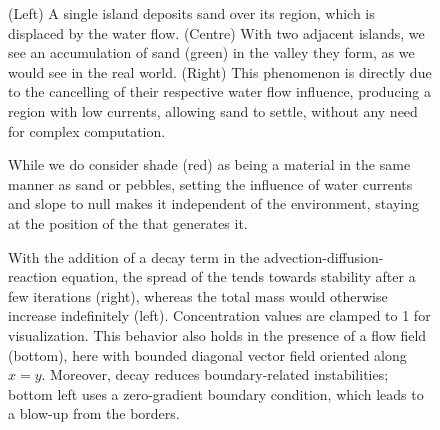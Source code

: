 \begin{figure}
    \caption{(Left) A single island deposits sand over its region, which is displaced by the water flow. (Centre) With two adjacent islands, we see an accumulation of sand (green) in the valley they form, as we would see in the real world. (Right) This phenomenon is directly due to the cancelling of their respective water flow influence, producing a region with low currents, allowing sand to settle, without any need for complex computation.}
    \label{fig:env-obj-double-island-sand-deposition}
\end{figure}

\begin{figure}
    \caption{While we do consider shade (red) as being a material in the same manner as sand or pebbles, setting the influence of water currents and slope to null makes it independent of the environment, staying at the position of the  that generates it.}
    \label{fig:env-obj-shade}
\end{figure}

\begin{figure}[H]
    \autofitcaptions[]{}
    \caption{With the addition of a decay term in the advection-diffusion-reaction equation, the spread of the  tends towards stability after a few iterations (right), whereas the total mass would otherwise increase indefinitely (left). Concentration values are clamped to 1 for visualization. This behavior also holds in the presence of a flow field (bottom), here with bounded diagonal vector field oriented along $x=y$. Moreover, decay reduces boundary-related instabilities; bottom left uses a zero-gradient boundary condition, which leads to a blow-up from the borders.}
    \label{fig:env-obj-stability-examples}
\end{figure}

